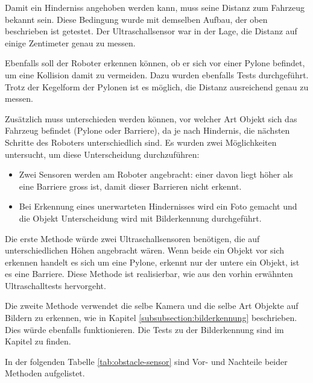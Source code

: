 Damit ein Hinderniss angehoben werden kann, muss seine Distanz zum Fahrzeug bekannt sein. Diese Bedingung wurde mit demselben Aufbau, der oben beschrieben ist getestet. Der Ultraschallsensor war in der Lage, die Distanz auf einige Zentimeter genau zu messen.

Ebenfalls soll der Roboter erkennen können, ob er sich vor einer Pylone befindet, um eine Kollision damit zu vermeiden. Dazu wurden ebenfalls Tests durchgeführt. Trotz der Kegelform der Pylonen ist es möglich, die Distanz ausreichend genau zu messen.

Zusätzlich muss unterschieden werden können, vor welcher Art Objekt sich das Fahrzeug befindet (Pylone oder Barriere), da je nach Hindernis, die nächsten Schritte des Roboters unterschiedlich sind. Es wurden zwei Möglichkeiten untersucht, um diese Unterscheidung durchzuführen:

\begin{itemize}
    \item Zwei Sensoren werden am Roboter angebracht: einer davon liegt höher als eine Barriere gross ist, damit dieser Barrieren nicht erkennt.
    \item Bei Erkennung eines unerwarteten Hindernisses wird ein Foto gemacht und die Objekt Unterscheidung wird mit Bilderkennung durchgeführt.
\end{itemize}

Die erste Methode würde zwei Ultraschallsensoren benötigen, die auf unterschiedlichen Höhen angebracht wären. Wenn beide ein Objekt vor sich erkennen handelt es sich um eine Pylone, erkennt nur der untere ein Objekt, ist es eine Barriere. Diese Methode ist realisierbar, wie aus den vorhin erwähnten Ultraschalltests hervorgeht.

Die zweite Methode verwendet die selbe Kamera und die selbe Art Objekte auf Bildern zu erkennen, wie in Kapitel \ref{subsubsection:bilderkennung} beschrieben. Dies würde ebenfalls funktionieren. Die Tests zu der Bilderkennung sind im Kapitel  zu finden.

In der folgenden Tabelle \ref{tab:obstacle-sensor} sind Vor- und Nachteile beider Methoden aufgelistet.


